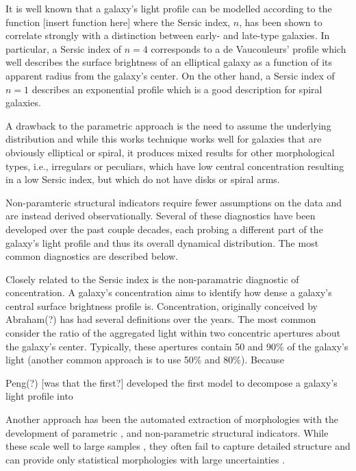It is well known that a galaxy's light profile can be modelled according to the function [insert function here] where the Sersic index, $n$, has been shown to correlate strongly with a distinction between early- and late-type galaxies. In particular, a Sersic index of $n=4$ corresponds to a de Vaucouleurs' profile which well describes the surface brightness of an elliptical galaxy as a function of its apparent radius from the galaxy's center. On the other hand, a Sersic index of $n=1$ describes an exponential profile which is a good description for spiral galaxies. 

A drawback to the parametric approach is the need to assume the underlying distribution and while this works technique works well for galaxies that are obviously elliptical or spiral, it produces mixed results for other morphological types, i.e., irregulars or peculiars, which have low central concentration resulting in a low Sersic index, but which do not have disks or spiral arms. 

Non-paramteric structural indicators require fewer assumptions on the data and are instead derived observationally. Several of these diagnostics have been developed over the past couple decades, each probing a different part of the galaxy's light profile and thus its overall dynamical distribution. The most common diagnostics are described below. 

Closely related to the Sersic index is the non-paramatric diagnostic of concentration. A galaxy's concentration aims to identify how dense a galaxy's central surface brightness profile is. Concentration, originally conceived by Abraham(?) has had several definitions over the years. The most common consider the ratio of the aggregated light within two concentric apertures about the galaxy's center. Typically, these apertures contain 50 and 90\% of the galaxy's light (another common approach is to use 50\% and 80\%). Because 


Peng(?) [was that the first?] developed the first model to decompose a galaxy's light profile into 

Another approach has been the automated extraction of morphologies with the development of parametric \citep{Sersic1968, Odewahn2002, Peng2002}, and non-parametric 
\citep{Abraham1994, 
	   Conselice2003, 
	   Abraham2003, 
	   Lotz2004,  
	   Freeman2013} 
structural indicators. While these scale well to large samples 
\citep[e.g.,][]{Simard2011, 
			Griffith2012, 
			Casteels2014, 
			Holwerda2014, 
			Meert2016}, 
they often fail to capture detailed structure and can provide only statistical morphologies with large uncertainties \cite[e.g.,][]{Abraham1996, Bershady2000}. 


